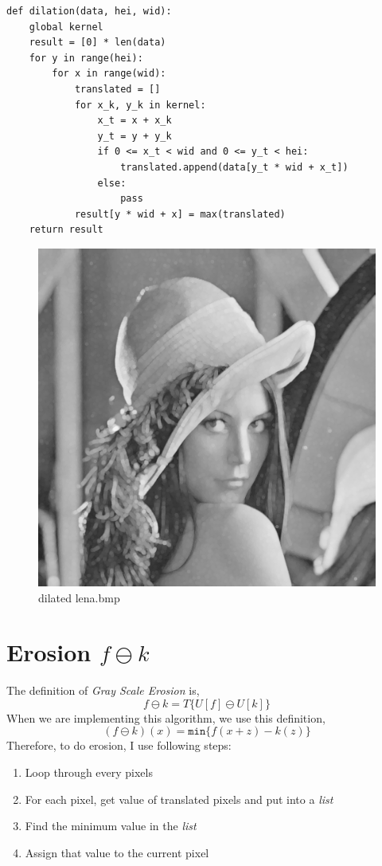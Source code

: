 \documentclass[14pt,a4paper]{extarticle}
\begin{document}
\begin{lstlisting}
def dilation(data, hei, wid):
    global kernel
    result = [0] * len(data)
    for y in range(hei):
        for x in range(wid):
            translated = []
            for x_k, y_k in kernel:
                x_t = x + x_k
                y_t = y + y_k
                if 0 <= x_t < wid and 0 <= y_t < hei:
                    translated.append(data[y_t * wid + x_t])
                else:
                    pass
            result[y * wid + x] = max(translated)
    return result
\end{lstlisting}

\begin{figure}[H]
\centering
\includegraphics[scale=0.6]{lena-dilated.bmp}
\caption{dilated lena.bmp}
\label{fig:lena-dilated.bmp}
\end{figure}

\section{Erosion $f \ominus k$}

The definition of \textit{Gray Scale Erosion} is,
\[ f \ominus k = T\{U[f] \ominus U[k] \} \]
When we are implementing this algorithm, we use this definition,
\[ (f \ominus k)(x) = \texttt{min}\{ f(x+z) - k(z) \} \]
Therefore, to do erosion, I use following steps:
\begin{enumerate}
	\item Loop through every pixels
	\item For each pixel, get value of translated pixels and put into a \textit{list}
	\item Find the minimum value in the \textit{list}
	\item Assign that value to the current pixel
\end{enumerate}
\end{document}
